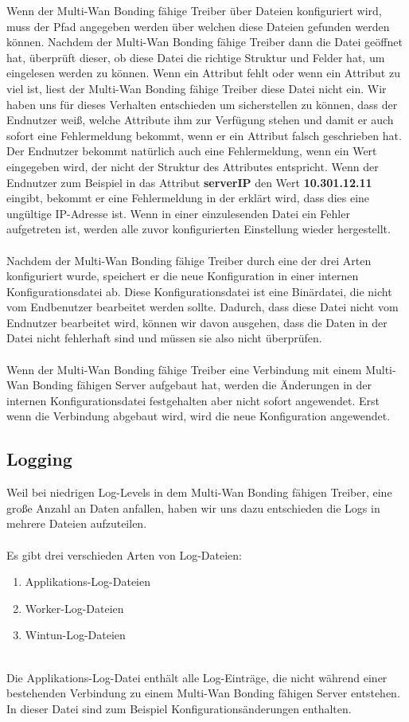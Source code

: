 \newpage
\noindent
Wenn der Multi-Wan Bonding fähige Treiber über Dateien konfiguriert wird, muss der Pfad angegeben werden über welchen diese Dateien gefunden werden können. Nachdem der Multi-Wan Bonding fähige Treiber dann die Datei geöffnet hat, überprüft dieser, ob diese Datei die richtige Struktur und Felder hat, um eingelesen werden zu können. Wenn ein Attribut fehlt oder wenn ein Attribut zu viel ist, liest der Multi-Wan Bonding fähige Treiber diese Datei nicht ein. Wir haben uns für dieses Verhalten entschieden um sicherstellen zu können, dass der Endnutzer weiß, welche Attribute ihm zur Verfügung stehen und damit er auch sofort eine Fehlermeldung bekommt, wenn er ein Attribut falsch geschrieben hat. Der Endnutzer bekommt natürlich auch eine Fehlermeldung, wenn ein Wert eingegeben wird, der nicht der Struktur des Attributes entspricht. Wenn der Endnutzer zum Beispiel in das Attribut \textbf{serverIP} den Wert \textbf{10.301.12.11} eingibt, bekommt er eine Fehlermeldung in der erklärt wird, dass dies eine ungültige IP-Adresse ist. Wenn in einer einzulesenden Datei ein Fehler aufgetreten ist, werden alle zuvor konfigurierten Einstellung wieder hergestellt. 
\\\\
Nachdem der Multi-Wan Bonding fähige Treiber durch eine der drei Arten konfiguriert wurde, speichert er die neue Konfiguration in einer internen Konfigurationsdatei ab. Diese Konfigurationsdatei ist eine Binärdatei, die nicht vom Endbenutzer bearbeitet werden sollte. Dadurch, dass diese Datei nicht vom Endnutzer bearbeitet wird, können wir davon ausgehen, dass die Daten in der Datei nicht fehlerhaft sind und müssen sie also nicht   überprüfen.
\\\\
Wenn der Multi-Wan Bonding fähige Treiber eine Verbindung mit einem Multi-Wan Bonding fähigen Server aufgebaut hat, werden die Änderungen in der internen Konfigurationsdatei festgehalten aber nicht sofort angewendet. Erst wenn die Verbindung abgebaut wird, wird die neue Konfiguration angewendet.
\subsection{Logging}
Weil bei niedrigen Log-Levels in dem Multi-Wan Bonding fähigen Treiber, eine große Anzahl an Daten anfallen, haben wir uns dazu entschieden die Logs in mehrere Dateien aufzuteilen.
\\\\
Es gibt drei verschieden Arten von Log-Dateien:
\\
\begin{enumerate}
    \item Applikations-Log-Dateien
    \item Worker-Log-Dateien
    \item Wintun-Log-Dateien
\end{enumerate}
\ \\
Die Applikations-Log-Datei enthält alle Log-Einträge, die nicht während einer bestehenden Verbindung zu einem Multi-Wan Bonding fähigen Server entstehen. In dieser Datei sind zum Beispiel Konfigurationsänderungen enthalten.

